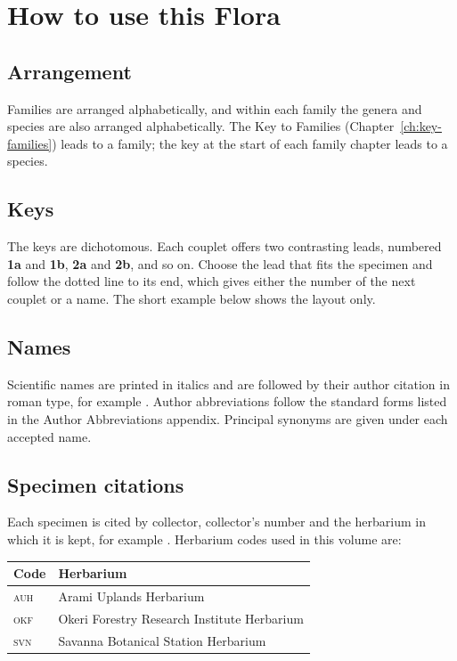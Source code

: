 \chapter{How to use this Flora}

\section*{Arrangement}
Families are arranged alphabetically, and within each family the
genera and species are also arranged alphabetically. The Key to
Families (Chapter~\ref{ch:key-families}) leads to a family; the key at the start
of each family chapter leads to a species.

\section*{Keys}
The keys are dichotomous. Each couplet offers two contrasting leads,
numbered \textbf{1a} and \textbf{1b}, \textbf{2a} and \textbf{2b}, and
so on. Choose the lead that fits the specimen and follow the dotted
line to its end, which gives either the number of the next couplet or
a name. The short example below shows the layout only.

\begin{florakey}
\end{florakey}

\section*{Names}
Scientific names are printed in italics and are followed by their
author citation in roman type, for example
. Author abbreviations
follow the standard forms listed in the Author Abbreviations
appendix. Principal synonyms are given under each accepted name.

\section*{Specimen citations}
Each specimen is cited by collector, collector's number and the
herbarium in which it is kept, for example
. Herbarium codes used in this volume are:

\medskip
\begin{tabular}{@{}ll@{}}
	\toprule
	Code & Herbarium \\
	\midrule
	\textsc{auh} & Arami Uplands Herbarium \\
	\textsc{okf} & Okeri Forestry Research Institute Herbarium \\
	\textsc{svn} & Savanna Botanical Station Herbarium \\
	\bottomrule
\end{tabular}

